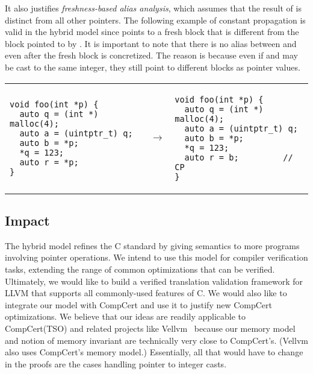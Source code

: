 It also justifies %
\textit{freshness-based alias analysis}, which assumes that the result of
 is distinct from all other pointers.  The 
following example of constant propagation is valid in the
hybrid model since  points to a fresh block that
is different from the block pointed to by .
It is important to note that there is no alias
between  and  even after
the fresh block is concretized. The reason is because
even if  and  may be cast to the same integer,
they still point to different blocks as pointer values.
\begin{center}
\begin{tabular}{@{}l@{}l@{~~}l}
\small
\begin{minipage}{0.45\textwidth}
\begin{verbatim}
void foo(int *p) {
  auto q = (int *) malloc(4);
  auto a = (uintptr_t) q;
  auto b = *p;
  *q = 123;
  auto r = *p;
}
\end{verbatim}
\end{minipage}
&
$~\rightarrow$
&
\small
\begin{minipage}{0.45\textwidth}
\begin{verbatim}
void foo(int *p) {
  auto q = (int *) malloc(4);
  auto a = (uintptr_t) q;
  auto b = *p;
  *q = 123;
  auto r = b;         // CP
}
\end{verbatim}
\end{minipage}
\end{tabular}
\end{center}




\subsection{Impact}


The hybrid model refines the C standard by giving semantics to more programs involving pointer
operations. We intend to use this model for compiler verification tasks, extending the range of
common optimizations that can be verified. Ultimately, we would like to build a verified translation
validation framework for LLVM that supports all commonly-used features of C. We would also like to
integrate our model with CompCert and use it to justify new CompCert optimizations.  We believe that
our ideas are readily applicable to CompCert(TSO) and related projects like
Vellvm~\cite{vellvm:popl12,vellvm:pldi13} because our memory model and notion of memory invariant
are technically very close to CompCert's. (Vellvm also uses CompCert's memory model.) Essentially,
all that would have to change in the proofs are the cases handling pointer to integer casts.



